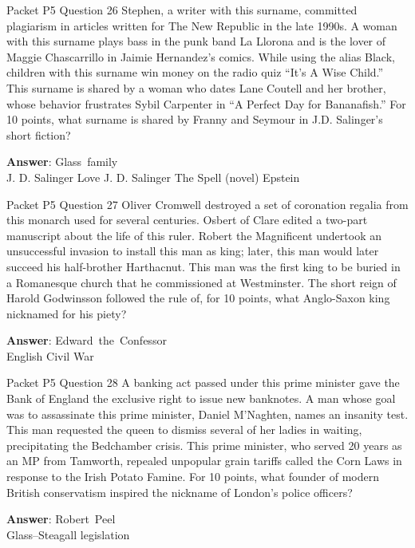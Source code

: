 \begin{frame}{Packet P5 Question 26}
Stephen, a writer with this surname, committed plagiarism in articles written for The New Republic in the late 1990s. A woman with this surname plays bass in the punk band La Llorona and is the lover of Maggie Chascarrillo in Jaimie Hernandez's comics. While using the alias Black, children with this surname win money on the radio quiz “It’s A Wise Child.” This surname is shared by a woman who dates Lane Coutell and her brother, whose behavior frustrates Sybil Carpenter in ``A Perfect Day for Bananafish.'' For 10 points,   what surname is shared by Franny and Seymour in J.D. Salinger's short fiction?        

\textbf{Answer}: Glass\ family\\
 J. D. Salinger
 Love
 J. D. Salinger
 The Spell (novel)
 Epstein
\end{frame}

\begin{frame}{Packet P5 Question 27}
Oliver Cromwell destroyed   a set of coronation regalia from this monarch used for several centuries. Osbert of Clare edited a two-part manuscript about the life of this ruler. Robert the Magnificent undertook an unsuccessful invasion to install this man as king; later, this man would later succeed his half-brother Harthacnut. This man was the     first king to be buried in a Romanesque church that he commissioned at Westminster. The short reign of Harold Godwinsson   followed the rule of, for 10 points, what Anglo-Saxon king nicknamed for his   piety?

\textbf{Answer}: Edward\ the\ Confessor\\
 English Civil War
\end{frame}

\begin{frame}{Packet P5 Question 28}
A banking act passed under   this prime minister gave the Bank of England the exclusive right to issue new banknotes. A man whose goal was to assassinate this prime minister, Daniel M'Naghten, names an insanity   test. This man requested the queen to dismiss several   of her ladies in waiting, precipitating the Bedchamber crisis. This prime minister, who served 20 years as an MP from Tamworth, repealed unpopular grain tariffs called the Corn Laws in response to the Irish Potato Famine. For 10 points, what   founder of modern British conservatism   inspired the nickname of London's police officers?

\textbf{Answer}: Robert\ Peel\\
 Glass–Steagall legislation
\end{frame}

